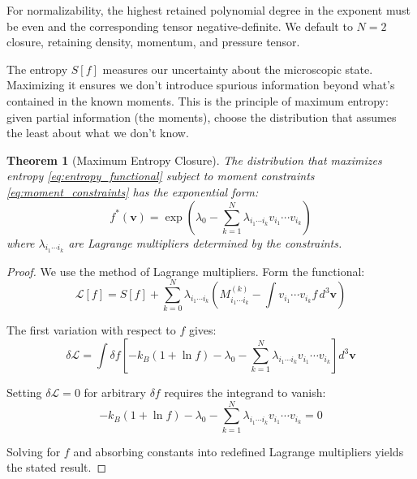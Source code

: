 \documentclass[12pt,a4paper]{article}
\newtheorem{theorem}{Theorem}[section]
\newcommand{\vect}[1]{\mathbf{#1}}
\begin{document}
For normalizability, the highest retained polynomial degree in the exponent must be even and the corresponding tensor negative-definite. We default to $N=2$ closure, retaining density, momentum, and pressure tensor.

The entropy $S[f]$ measures our uncertainty about the microscopic state. Maximizing it ensures we don't introduce spurious information beyond what's contained in the known moments. This is the principle of maximum entropy: given partial information (the moments), choose the distribution that assumes the least about what we don't know.

\begin{theorem}[Maximum Entropy Closure]
\label{thm:maxent}
The distribution that maximizes entropy \eqref{eq:entropy_functional} subject to moment constraints \eqref{eq:moment_constraints} has the exponential form:
\begin{equation}
f^*(\vect{v}) = \exp\left(\lambda_0 - \sum_{k=1}^N \lambda_{i_1 \cdots i_k} v_{i_1} \cdots v_{i_k}\right)
\label{eq:maxent_distribution}
\end{equation}
where $\lambda_{i_1 \cdots i_k}$ are Lagrange multipliers determined by the constraints.
\end{theorem}

\begin{proof}
We use the method of Lagrange multipliers. Form the functional:
\begin{equation}
\mathcal{L}[f] = S[f] + \sum_{k=0}^N \lambda_{i_1 \cdots i_k} \left(M_{i_1 \cdots i_k}^{(k)} - \int v_{i_1} \cdots v_{i_k} f \, d^3\vect{v}\right)
\label{eq:lagrangian_functional}
\end{equation}

The first variation with respect to $f$ gives:
\begin{equation}
\delta \mathcal{L} = \int \delta f \left[-k_B(1 + \ln f) - \lambda_0 - \sum_{k=1}^N \lambda_{i_1 \cdots i_k} v_{i_1} \cdots v_{i_k}\right] d^3\vect{v}
\label{eq:variation}
\end{equation}

Setting $\delta \mathcal{L} = 0$ for arbitrary $\delta f$ requires the integrand to vanish:
\begin{equation}
-k_B(1 + \ln f) - \lambda_0 - \sum_{k=1}^N \lambda_{i_1 \cdots i_k} v_{i_1} \cdots v_{i_k} = 0
\label{eq:euler_lagrange}
\end{equation}

Solving for $f$ and absorbing constants into redefined Lagrange multipliers yields the stated result.
\end{proof}
\end{document}
